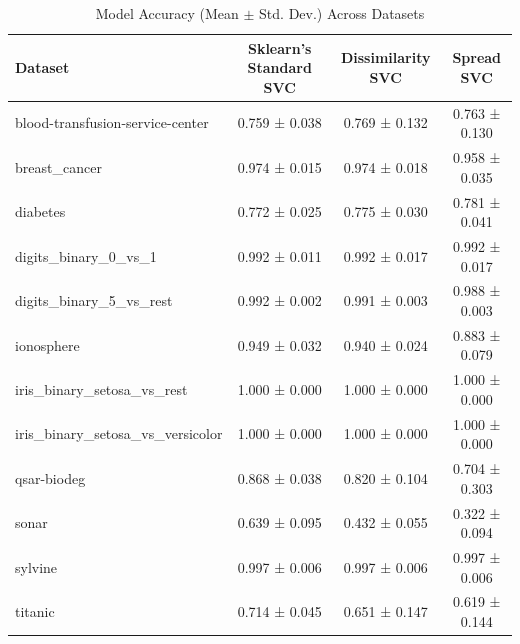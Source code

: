 \documentclass[conference]{IEEEtran}
\begin{document}
\begin{table}[htbp]
\caption{Model Accuracy (Mean $\pm$ Std. Dev.) Across Datasets}
\begin{center}
\begin{tabular}{lccc}
\toprule
\textbf{Dataset} & \textbf{Sklearn's Standard SVC} & \textbf{Dissimilarity SVC} & \textbf{Spread SVC} \\
\midrule
blood-transfusion-service-center & 0.759 ± 0.038 & 0.769 ± 0.132 & 0.763 ± 0.130 \\
breast\_cancer & 0.974 ± 0.015 & 0.974 ± 0.018 & 0.958 ± 0.035 \\
diabetes & 0.772 ± 0.025 & 0.775 ± 0.030 & 0.781 ± 0.041 \\
digits\_binary\_0\_vs\_1 & 0.992 ± 0.011 & 0.992 ± 0.017 & 0.992 ± 0.017 \\
digits\_binary\_5\_vs\_rest & 0.992 ± 0.002 & 0.991 ± 0.003 & 0.988 ± 0.003 \\
ionosphere & 0.949 ± 0.032 & 0.940 ± 0.024 & 0.883 ± 0.079 \\
iris\_binary\_setosa\_vs\_rest & 1.000 ± 0.000 & 1.000 ± 0.000 & 1.000 ± 0.000 \\
iris\_binary\_setosa\_vs\_versicolor & 1.000 ± 0.000 & 1.000 ± 0.000 & 1.000 ± 0.000 \\
qsar-biodeg & 0.868 ± 0.038 & 0.820 ± 0.104 & 0.704 ± 0.303 \\
sonar & 0.639 ± 0.095 & 0.432 ± 0.055 & 0.322 ± 0.094 \\
sylvine & 0.997 ± 0.006 & 0.997 ± 0.006 & 0.997 ± 0.006 \\
titanic & 0.714 ± 0.045 & 0.651 ± 0.147 & 0.619 ± 0.144 \\
\bottomrule
\end{tabular}
\label{tab:accuracy}
\end{center}
\end{table}
\end{document}
